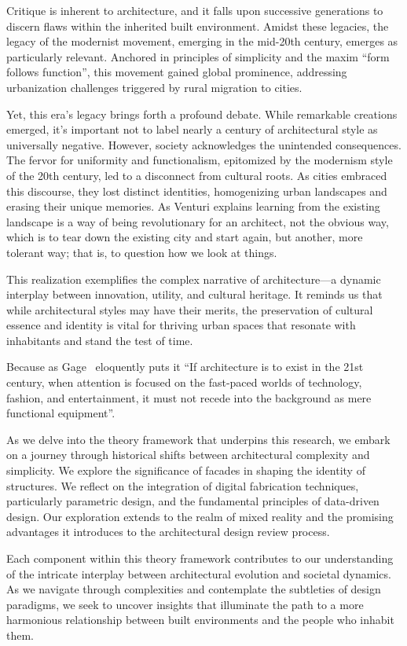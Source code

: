 Critique is inherent to architecture, and it falls upon successive generations to discern flaws within the inherited built environment.
Amidst these legacies, the legacy of the modernist movement, emerging in the mid-20th century, emerges as particularly relevant.
Anchored in principles of simplicity and the maxim ``form follows function'', this movement gained global prominence, addressing urbanization challenges triggered by rural migration to cities.

Yet, this era's legacy brings forth a profound debate.
While remarkable creations emerged, it's important not to label nearly a century of architectural style as universally negative.
However, society acknowledges the unintended consequences.
The fervor for uniformity and functionalism, epitomized by the modernism style of the 20th century, led to a disconnect from cultural roots.
As cities embraced this discourse, they lost distinct identities, homogenizing urban landscapes and erasing their unique memories.
As Venturi\cite{Venturi1972} explains learning from  the existing landscape  is  a  way of being revolutionary for  an  architect, not the obvious way, which is to tear down the existing city and start again, but another, more tolerant way;
that is, to question how we look at things.

This realization exemplifies the complex narrative of architecture—a dynamic interplay between innovation, utility, and cultural heritage.
It reminds us that while architectural styles may have their merits, the preservation of cultural essence and identity is vital for thriving urban spaces that resonate with inhabitants and stand the test of time.

 Because as Gage~\cite{Gage2015} eloquently puts it ``If architecture is to exist in the 21st century, when attention is focused on the fast-paced worlds of technology, fashion, and entertainment, it must not recede into the background as mere functional equipment''.

As we delve into the theory framework that underpins this research, we embark on a journey through historical shifts between architectural complexity and simplicity.
We explore the significance of facades in shaping the identity of structures.
We reflect on the integration of digital fabrication techniques, particularly parametric design, and the fundamental principles of data-driven design.
Our exploration extends to the realm of mixed reality and the promising advantages it introduces to the architectural design review process.

Each component within this theory framework contributes to our understanding of the intricate interplay between architectural evolution and societal dynamics.
As we navigate through complexities and contemplate the subtleties of design paradigms, we seek to uncover insights that illuminate the path to a more harmonious relationship between built environments and the people who inhabit them.




